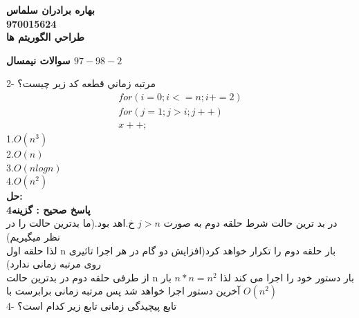 \documentclass{book}
\begin{document}
\begin{center}
\textbf{بهاره برادران سلماس\\ 970015624\\ طراحي الگوريتم ها}\\
\end{center}
\begin{center}
\textbf{سوالات نيمسال $97-98-2$}\\
\end{center}
2- مرتبه زماني قطعه كد زير چيست؟\\
\[
\begin{align*}
for(i=0;i<=n; i+=2)\\
for(j=1 ; j>i ;j++)\\
x++;
\end{align*}
\]
1.$O(n^3)$ \\
2.$O(n)$ \\
3.$O(nlogn)$ \\
4.$O(n^2)$\\
\textbf{حل:}\\
\textbf{پاسخ صحیح : گزینه4}\\
در بد ترین حالت شرط حلقه دوم به صورت $j>n$ خ.اهد بود.(ما بدترین حالت را در نظر میگیریم)\\
لذا حلقه اول n بار حلقه دوم را تکرار خواهد کرد(افزایش دو گام در هر اجرا تاثیری روی مرتبه زمانی ندارد)\\
از طرفی حلقه دوم در بدترین حالت n بار دستور خود را اجرا می کند لذا $n*n=n^2$ بار آخرین دستور اجرا خواهد شد پس مرتبه زمانی برابرست با $O(n^2)$\\

4- تابع پیچیدگی زمانی تابع زیر کدام است؟ \\
\end{document}

